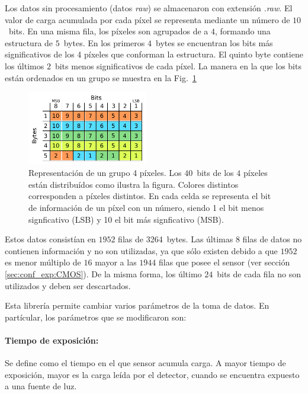 \documentclass[twoside,twocolumn]{article}
\begin{document}
      Los datos sin procesamiento (datos \emph{raw}) se almacenaron con extensión \emph{.raw}.
      El valor de carga acumulada por cada píxel se representa mediante un número de $10$~bits.
      En una misma fila, los píxeles son agrupados de a $4$, formando una estructura de $5$~bytes.
      En los primeros $4$~bytes se encuentran los bits más significativos de los 4 píxeles que conforman la estructura.
      El quinto byte contiene los últimos $2$~bits menos significativos de cada píxel.\cite{picamera}
      La manera en la que los bits están ordenados en un grupo se muestra en la Fig.~\ref{fig:arreglo}

      \begin{figure}[h]
        \includegraphics[width=0.47\textwidth]{figures/bayer_bytes.pdf}
        \caption{Representación de un grupo 4 píxeles.
        Los $40$~bits de los $4$ píxeles están distribuídos como ilustra la figura.
        Colores distintos corresponden a píxeles distintos.
        En cada celda se representa el bit de información de un píxel con un número,
        siendo 1 el bit menos signficativo (LSB) y 10 el bit más signficativo (MSB).}
        \label{fig:arreglo}
      \end{figure}

      Estos datos consistían en $1952$ filas de 3264~bytes.
      Las últimas $8$ filas de datos no contienen información y no son utilizadas,
      ya que sólo existen debido a que $1952$ es menor múltiplo de $16$
      mayor a las $1944$ filas que posee el sensor (ver sección \ref{sec:conf_exp:CMOS}).
      De la misma forma, los último $24$~bits de cada fila no son utilizados y deben ser descartados.

      Esta librería permite cambiar varios parámetros de la toma de datos.
      En partícular, los parámetros que se modificaron son:
      \paragraph{Tiempo de exposición:}
        Se define como el tiempo en el que sensor acumula carga.
        A mayor tiempo de exposición, mayor es la carga leída por el detector,
        cuando se encuentra expuesto a una fuente de luz.
        
\end{document}

